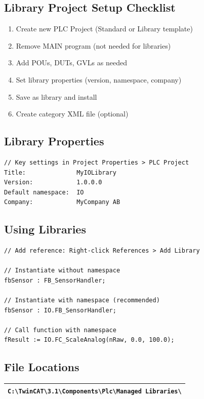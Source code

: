 \documentclass[11pt,a4paper]{article}
\begin{document}
\subsection*{Library Project Setup Checklist}

\begin{enumerate}
    \item Create new PLC Project (Standard or Library template)
    \item Remove MAIN program (not needed for libraries)
    \item Add POUs, DUTs, GVLs as needed
    \item Set library properties (version, namespace, company)
    \item Save as library and install
    \item Create category XML file (optional)
\end{enumerate}

\subsection*{Library Properties}

\begin{lstlisting}
// Key settings in Project Properties > PLC Project
Title:              MyIOLibrary
Version:            1.0.0.0
Default namespace:  IO
Company:            MyCompany AB
\end{lstlisting}

\subsection*{Using Libraries}

\begin{lstlisting}
// Add reference: Right-click References > Add Library

// Instantiate without namespace
fbSensor : FB_SensorHandler;

// Instantiate with namespace (recommended)
fbSensor : IO.FB_SensorHandler;

// Call function with namespace
fResult := IO.FC_ScaleAnalog(nRaw, 0.0, 100.0);
\end{lstlisting}

\subsection*{File Locations}

\begin{table}[h]
\centering
\begin{tabular}{@{}l@{}}
\toprule
\texttt{C:\textbackslash TwinCAT\textbackslash 3.1\textbackslash Components\textbackslash Plc\textbackslash Managed Libraries\textbackslash} \\
\bottomrule
\end{tabular}
\end{table}
\end{document}
